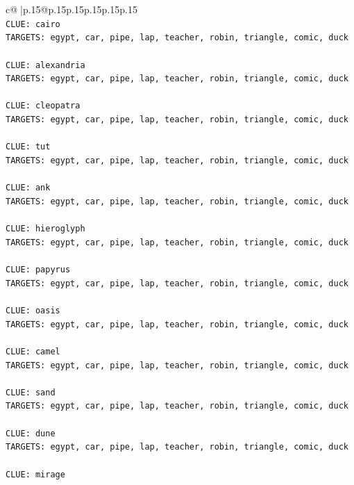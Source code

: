 \documentclass{article}
\begin{document}
{\begin{supertabular}{c@{$\;$}|p{.15\linewidth}@{}p{.15\linewidth}p{.15\linewidth}p{.15\linewidth}p{.15\linewidth}p{.15\linewidth}}
{{{\\ 
\texttt{CLUE: cairo} \\
\texttt{TARGETS: egypt, car, pipe, lap, teacher, robin, triangle, comic, duck} \\
\\ 
\texttt{CLUE: alexandria} \\
\texttt{TARGETS: egypt, car, pipe, lap, teacher, robin, triangle, comic, duck} \\
\\ 
\texttt{CLUE: cleopatra} \\
\texttt{TARGETS: egypt, car, pipe, lap, teacher, robin, triangle, comic, duck} \\
\\ 
\texttt{CLUE: tut} \\
\texttt{TARGETS: egypt, car, pipe, lap, teacher, robin, triangle, comic, duck} \\
\\ 
\texttt{CLUE: ank} \\
\texttt{TARGETS: egypt, car, pipe, lap, teacher, robin, triangle, comic, duck} \\
\\ 
\texttt{CLUE: hieroglyph} \\
\texttt{TARGETS: egypt, car, pipe, lap, teacher, robin, triangle, comic, duck} \\
\\ 
\texttt{CLUE: papyrus} \\
\texttt{TARGETS: egypt, car, pipe, lap, teacher, robin, triangle, comic, duck} \\
\\ 
\texttt{CLUE: oasis} \\
\texttt{TARGETS: egypt, car, pipe, lap, teacher, robin, triangle, comic, duck} \\
\\ 
\texttt{CLUE: camel} \\
\texttt{TARGETS: egypt, car, pipe, lap, teacher, robin, triangle, comic, duck} \\
\\ 
\texttt{CLUE: sand} \\
\texttt{TARGETS: egypt, car, pipe, lap, teacher, robin, triangle, comic, duck} \\
\\ 
\texttt{CLUE: dune} \\
\texttt{TARGETS: egypt, car, pipe, lap, teacher, robin, triangle, comic, duck} \\
\\ 
\texttt{CLUE: mirage} \\
}}}
\end{supertabular}}
\end{document}
